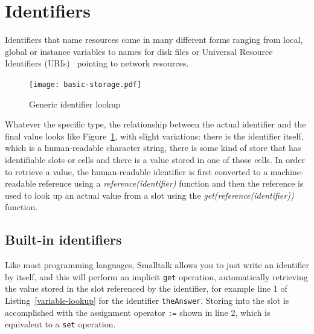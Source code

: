 \documentclass{acm_proc_article-sp}
\begin{document}





\section{Identifiers}
\label{identifiers}


Identifiers that name resources come in many different forms ranging from local,
global or instance variables to names for disk files or Universal Resource Identifiers (URIs)~\cite{rfc3986} pointing to network resources.

\begin{figure}[htbp]
\centering
\texttt{[image: basic-storage.pdf]}
\caption{Generic identifier lookup}
\label{identifier-eval}
\end{figure}

Whatever the specific type, the relationship between the actual identifier and the
final value looks like Figure~\ref{identifier-eval}, with slight variations:   there is 
the identifier itself, which is a human-readable character string, there is some kind
of store that has identifiable slots or cells and there is a value stored in one of those
cells.   In order to retrieve a value, the human-readable identifier is first converted to a machine-readable reference using a
 \emph{reference(identifier)} function and then the reference is used to look up an actual
value from a slot using the \emph{get(reference(identifier))} function.



\subsection{Built-in identifiers}
\label{direct-reference}

Like most programming languages, Smalltalk allows you to just write 
an identifier by itself, and this will perform an implicit {\tt get} operation, automatically retrieving the value stored in the slot referenced by the identifier, for
example line 1 of Listing~\ref{variable-lookup} for the identifier {\tt theAnswer}.
Storing into the slot is accomplished with
the assignment operator {\tt :=} shown in line 2, which is equivalent to a {\tt set} operation.
\end{document}
